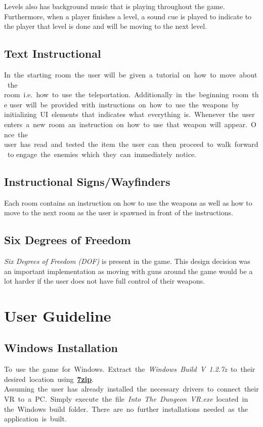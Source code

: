 \documentclass[12pt, twoside]{article}
\begin{document}
Levels also has background music that is playing throughout the game.
Furthermore, when a player finishes a level, a sound cue is played to indicate
to the player that level is done and will be moving to the next level.

\subsection{Text Instructional}
In the starting room the user will be given a tutorial on how to move about the
room i.e. how to use the teleportation. Additionally in the beginning room the
user will be provided with instructions on how to use the weapons by
initializing UI elements that indicates what everything is. Whenever the user
enters a new room an instruction on how to use that weapon will appear. Once the
user has read and tested the item the user can then proceed to walk forward to
engage the enemies which they can immediately notice. 

\subsection{Instructional Signs/Wayfinders}
Each room contains an instruction on how to use the weapons as well as how to
move to the next room as the user is spawned in front of the instructions.

\subsection{Six Degrees of Freedom}
\emph{Six Degrees of Freedom (DOF)} is present in the game. This design decision
was an important implementation as moving with guns around the game would be a
lot harder if the user does not have full control of their weapons.

\section{User Guideline}

\subsection{Windows Installation}
To use the game for Windows. Extract the \emph{Windows Build V 1.2.7z} to their
desired location using \textbf{\href{https://www.7-zip.org/download.html}{7zip}}.
Assuming the user has already installed the necessary drivers to connect their
VR to a PC. Simply execute the file \emph{Into The Dungeon VR.exe} located in
the Windows build folder. There are no further installations needed as the
application is built.
\end{document}
